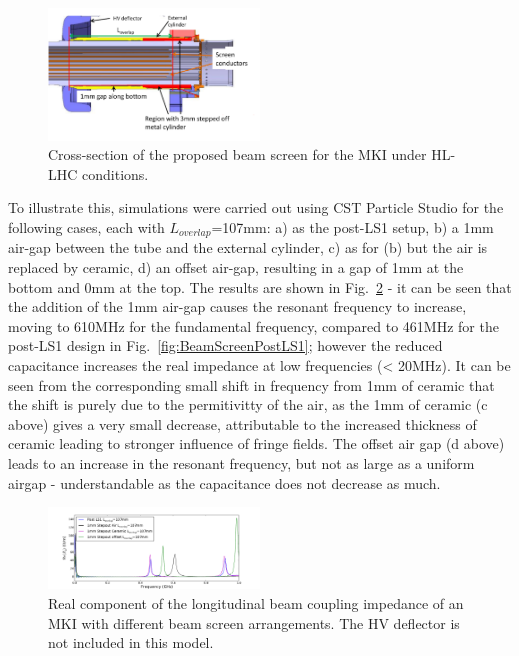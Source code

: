 \documentclass[a4paper,
              ]{jacow}
\begin{document}
\begin{figure}
\begin{center}
\includegraphics[width=0.5\textwidth]{HLLHCLayout.pdf}
\caption{Cross-section of the proposed beam screen for the MKI under HL-LHC conditions.}
\label{fig:BeamScreenHLLHC}
\end{center}
\end{figure}

To illustrate this, simulations were carried out using CST Particle Studio \cite{cst-cite} for the following cases, each with $L_{overlap}$=107mm: a) as the post-LS1 setup, b) a 1mm air-gap between the tube and the external cylinder, c) as for (b) but the air is replaced by ceramic, d) an offset air-gap, resulting in a gap of 1mm at the bottom and 0mm at the top. The results are shown in Fig.~\ref{fig:differentEndArrangement} - it can be seen that the addition of the 1mm air-gap causes the resonant frequency to increase, moving to 610MHz for the fundamental frequency, compared to 461MHz for the post-LS1 design in Fig.~\ref{fig:BeamScreenPostLS1}; however the reduced capacitance increases the real impedance at low frequencies (< 20MHz). It can be seen from the corresponding small shift in frequency from 1mm of ceramic that the shift is purely due to the permitivitty of the air, as the 1mm of ceramic (c above) gives a very small decrease, attributable to the increased thickness of ceramic leading to stronger influence of fringe fields. The offset air gap (d above) leads to an increase in the resonant frequency, but not as large as a uniform airgap - understandable as the capacitance does not decrease as much.

\begin{figure}
\begin{center}
\includegraphics[width=0.5\textwidth]{differentScreenSpacings.pdf}
\caption{Real component of the longitudinal beam coupling impedance of an MKI with different beam screen arrangements. The HV deflector is not included in this model.}
\label{fig:differentEndArrangement}
\end{center}
\end{figure}
\end{document}
